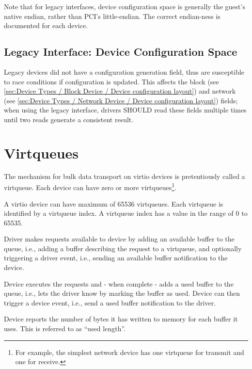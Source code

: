Note that for legacy interfaces, device configuration space is generally the
guest's native endian, rather than PCI's little-endian.
The correct endian-ness is documented for each device.

\subsection{Legacy Interface: Device Configuration Space}\label{sec:Basic Facilities of a Virtio Device / Device Configuration Space / Legacy Interface: Device Configuration Space}

Legacy devices did not have a configuration generation field, thus are
susceptible to race conditions if configuration is updated.  This
affects the block  (see \ref{sec:Device Types /
Block Device / Device configuration layout}) and
network  (see \ref{sec:Device Types / Network Device /
Device configuration layout}) fields;
when using the legacy interface, drivers SHOULD
read these fields multiple times until two reads generate a consistent
result.

\section{Virtqueues}\label{sec:Basic Facilities of a Virtio Device / Virtqueues}

The mechanism for bulk data transport on virtio devices is
pretentiously called a virtqueue. Each device can have zero or more
virtqueues\footnote{For example, the simplest network device has one virtqueue for
transmit and one for receive.}.

A virtio device can have maximum of 65536 virtqueues. Each virtqueue is
identified by a virtqueue index. A virtqueue index has a value in the
range of 0 to 65535.

Driver makes requests available to device by adding
an available buffer to the queue, i.e., adding a buffer
describing the request to a virtqueue, and optionally triggering
a driver event, i.e., sending an available buffer notification
to the device.

Device executes the requests and - when complete - adds
a used buffer to the queue, i.e., lets the driver
know by marking the buffer as used. Device can then trigger
a device event, i.e., send a used buffer notification to the driver.

Device reports the number of bytes it has written to memory for
each buffer it uses. This is referred to as ``used length''.

